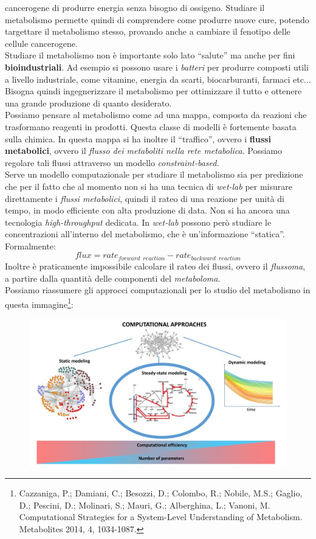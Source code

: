 \documentclass[a4paper,12pt, oneside]{book}
\begin{document}
cancerogene di produrre energia senza bisogno di ossigeno. Studiare il
metabolismo permette quindi di comprendere come produrre nuove cure, potendo
targettare il metabolismo stesso, provando anche a cambiare il fenotipo delle
cellule cancerogene.\\
Studiare il metabolismo non è importante solo lato ``salute'' ma anche per fini
\textbf{bioindustriali}. Ad esempio si possono usare i \textit{batteri} per
produrre composti utili a livello industriale, come vitamine, energia da scarti,
biocarburanti, farmaci
etc$\ldots$ Bisogna quindi ingegnerizzare il metabolismo per ottimizzare il
tutto e ottenere una grande produzione di quanto desiderato.\\
Possiamo pensare al metabolismo come ad una mappa, composta da reazioni che
trasformano reagenti in prodotti. Questa classe di modelli è fortemente basata
sulla chimica. In questa mappa si ha inoltre il ``traffico'', ovvero i
\textbf{flussi metabolici}, ovvero il \textit{flusso dei metaboliti nella rete
metabolica}. Possiamo regolare tali flussi attraverso un modello
\textit{constraint-based}.\\ 
Serve un modello computazionale per studiare il metabolismo sia per predizione
che per il fatto che al momento non si ha una tecnica di \textit{wet-lab} per
misurare direttamente i \textit{flussi metabolici}, quindi il rateo di una
reazione per unità 
di tempo, in modo efficiente con alta produzione di
data. Non si ha ancora una tecnologia \textit{high-throughput}
dedicata. In \textit{wet-lab} possono però studiare le concentrazioni
all'interno del metabolismo, che è un'informazione ``statica''.\\
Formalmente: 
\[flux=rate_{forward \,\,\,reaction}-rate_{backward\,\,\, reaction}\]
Inoltre è praticamente impossibile calcolare il rateo dei flussi, ovvero il \textit{flussoma}, a partire dalla
quantità delle componenti del \textit{metaboloma}.\\
Possiamo riassumere gli approcci computazionali per lo studio del metabolismo in
questa immagine\footnote{Cazzaniga, P.; Damiani, C.; Besozzi, D.; Colombo, R.;
  Nobile, M.S.; Gaglio, D.; Pescini, D.; Molinari, S.; Mauri, G.; Alberghina,
  L.; Vanoni, M. Computational 
Strategies for a System-Level Understanding of Metabolism. Metabolites 2014, 4,
1034-1087.}: 
\begin{figure}[H]
  \centering
  \includegraphics[scale = 0.35]{img/metcomp.jpg}
\end{figure}
\end{document}
